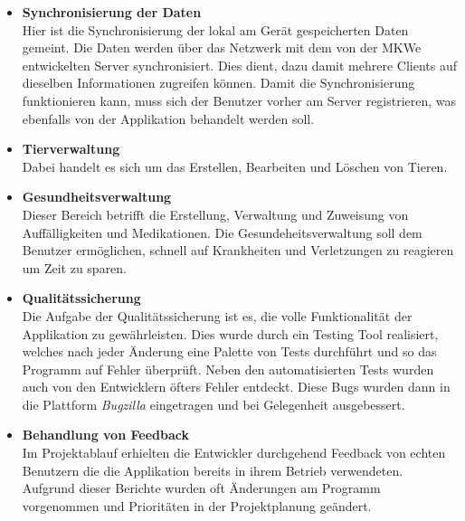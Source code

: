 \begin{itemize}
\item \textbf{Synchronisierung der Daten}\\
Hier ist die Synchronisierung der lokal am Gerät gespeicherten Daten gemeint. Die Daten werden über das Netzwerk mit dem von der MKWe entwickelten Server synchronisiert. Dies dient, dazu damit mehrere Clients auf dieselben Informationen zugreifen können. Damit die Synchronisierung funktionieren kann, muss sich der Benutzer vorher am Server registrieren, was ebenfalls von der Applikation behandelt werden soll. 
\item \textbf{Tierverwaltung}\\
Dabei handelt es sich um das Erstellen, Bearbeiten und Löschen von Tieren. 
\item \textbf{Gesundheitsverwaltung}\\
Dieser Bereich betrifft die Erstellung, Verwaltung und Zuweisung von Auffälligkeiten und Medikationen. Die Gesundeheitsverwaltung soll dem Benutzer ermöglichen, schnell auf Krankheiten und Verletzungen zu reagieren um Zeit zu sparen. 
\item \textbf{Qualitätssicherung}\\
Die Aufgabe der Qualitätssicherung ist es, die volle Funktionalität der Applikation zu gewährleisten. Dies wurde durch ein Testing Tool realisiert, welches nach jeder Änderung eine Palette von Tests durchführt und so das Programm auf Fehler überprüft. Neben den automatisierten Tests wurden auch von den Entwicklern öfters Fehler entdeckt. Diese Bugs wurden dann in die Plattform \textit{Bugzilla} eingetragen und bei Gelegenheit ausgebessert.
\item \textbf{Behandlung von Feedback}\\
Im Projektablauf erhielten die Entwickler durchgehend Feedback von echten Benutzern die die Applikation bereits in ihrem Betrieb verwendeten. Aufgrund dieser Berichte wurden oft Änderungen am Programm vorgenommen und Prioritäten in der Projektplanung geändert.
\end{itemize}  


